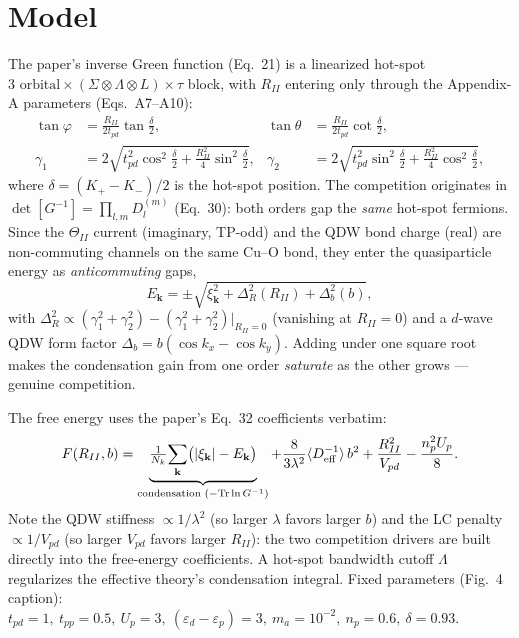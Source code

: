 \documentclass[11pt]{article}
\begin{document}
\section{Model}
The paper's inverse Green function (Eq.~21) is a linearized hot-spot
$3\text{ orbital}\times(\Sigma\otimes\Lambda\otimes L)\times\tau$ block, with
$R_{II}$ entering only through the Appendix-A parameters (Eqs.~A7--A10):
\begin{align}
\tan\varphi &= \tfrac{R_{II}}{2t_{pd}}\tan\tfrac{\delta}{2}, &
\tan\theta &= \tfrac{R_{II}}{2t_{pd}}\cot\tfrac{\delta}{2},\\
\gamma_1 &= 2\sqrt{t_{pd}^2\cos^2\tfrac{\delta}{2}+\tfrac{R_{II}^2}{4}\sin^2\tfrac{\delta}{2}}, &
\gamma_2 &= 2\sqrt{t_{pd}^2\sin^2\tfrac{\delta}{2}+\tfrac{R_{II}^2}{4}\cos^2\tfrac{\delta}{2}},
\end{align}
where $\delta=(K_+-K_-)/2$ is the hot-spot position. The competition originates
in $\det[G^{-1}]=\prod_{l,m}D_l^{(m)}$ (Eq.~30): both orders gap the \emph{same}
hot-spot fermions. Since the $\Theta_{II}$ current (imaginary, TP-odd) and the
QDW bond charge (real) are non-commuting channels on the same Cu--O bond, they
enter the quasiparticle energy as \emph{anticommuting} gaps,
\begin{equation}
E_{\mathbf k}=\pm\sqrt{\xi_{\mathbf k}^2 + \Delta_R^2(R_{II}) + \Delta_b^2(b)},
\end{equation}
with $\Delta_R^2\propto(\gamma_1^2+\gamma_2^2)-(\gamma_1^2+\gamma_2^2)|_{R_{II}=0}$
(vanishing at $R_{II}=0$) and a $d$-wave QDW form factor
$\Delta_b=b(\cos k_x-\cos k_y)$. Adding under one square root makes the
condensation gain from one order \emph{saturate} as the other grows --- genuine
competition.

The free energy uses the paper's Eq.~32 coefficients verbatim:
\begin{equation}
F(R_{II},b)=\underbrace{\tfrac{1}{N_k}\!\sum_{\mathbf k}\!\big(|\xi_{\mathbf k}|-E_{\mathbf k}\big)}_{\text{condensation }(-\mathrm{Tr}\ln G^{-1})}
+\frac{8}{3\lambda^2}\langle D_{\rm eff}^{-1}\rangle\, b^2
+\frac{R_{II}^2}{V_{pd}}-\frac{n_p^2 U_p}{8}.
\end{equation}
Note the QDW stiffness $\propto 1/\lambda^2$ (so larger $\lambda$ favors larger
$b$) and the LC penalty $\propto 1/V_{pd}$ (so larger $V_{pd}$ favors larger
$R_{II}$): the two competition drivers are built directly into the free-energy
coefficients. A hot-spot bandwidth cutoff $\Lambda$ regularizes the effective
theory's condensation integral. Fixed parameters (Fig.~4 caption):
$t_{pd}{=}1,\ t_{pp}{=}0.5,\ U_p{=}3,\ (\varepsilon_d-\varepsilon_p){=}3,\
m_a{=}10^{-2},\ n_p{=}0.6,\ \delta{=}0.93$.
\end{document}
